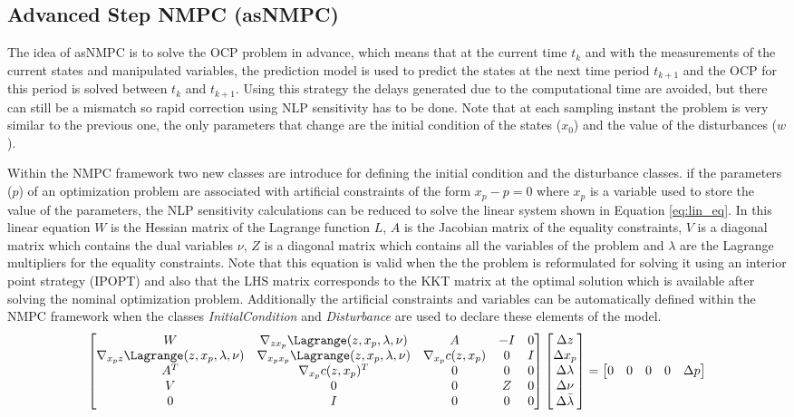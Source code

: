 \documentclass{article}
\begin{document}
\subsection{Advanced Step NMPC (asNMPC)}
The idea of asNMPC is to solve the OCP problem in advance, which means that at the current time $t_k$ and with the measurements of the current states and manipulated variables, the prediction model is used to predict the states at the next time period $t_{k+1}$ and the OCP for this period is solved between $t_k$ and $t_{k+1}$.
Using this strategy the delays generated due to the computational time are avoided, but there can still be a mismatch so rapid correction using NLP sensitivity has to be done.
Note that at each sampling instant the problem is very similar to the previous one, the only parameters that change are the initial condition of the states ($x_0$) and the value of the disturbances ($w$).
\par
Within the NMPC framework two new classes are introduce for defining the initial condition and the disturbance classes.
if the parameters ($p$) of an optimization problem are associated with artificial constraints of the form $x_p-p=0$ where $x_p$ is a variable used to store the value of the parameters, the NLP sensitivity calculations can be reduced to solve the linear system shown in Equation \ref{eq:lin_eq}.
In this linear equation $W$ is the Hessian matrix of the Lagrange function $L$, $A$ is the Jacobian matrix of the equality constraints, $V$ is a diagonal matrix which contains the dual variables $\nu$, $Z$ is a diagonal matrix which contains all the variables of the problem and $\lambda$ are the Lagrange multipliers for the equality constraints.
Note that this equation is valid when the the problem is reformulated for solving it using an interior point strategy (IPOPT) and also that the LHS matrix corresponds to the KKT matrix at the optimal solution which is available after solving the nominal optimization problem.
Additionally the artificial constraints and variables can be automatically defined within the NMPC framework when the classes \textit{InitialCondition} and \textit{Disturbance} are used to declare these elements of the model.
\begin{equation}
	\begin{bmatrix} 
		W & \nabla_{zx_p}\Lagrange(z,x_p,\lambda,\nu) & A & -I & 0\\
		\nabla_{x_pz}\Lagrange(z,x_p,\lambda,\nu) & \nabla_{x_px_p}\Lagrange(z,x_p,\lambda,\nu) & \nabla_{x_p}c(z,x_p) & 0 & I\\
		A^T & \nabla_{x_p}c(z,x_p)^T & 0 & 0 & 0\\
		V & 0 & 0 & Z & 0\\
		0 & I & 0 & 0 & 0
	\end{bmatrix}
	\begin{bmatrix} 
	\Delta z\\ \Delta x_p \\ \Delta \lambda \\ \Delta \nu \\ \Delta \bar{\lambda}
	\end{bmatrix}
	=
	\begin{bmatrix}0 & 0 & 0 &0 & \Delta p \end{bmatrix}
	\label{eq:lin_eq}
\end{equation}
\end{document}
